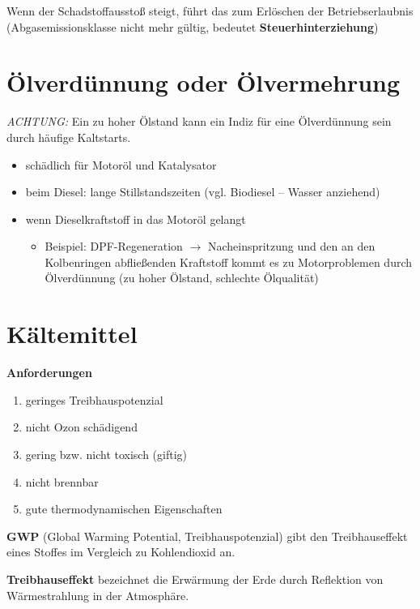 Wenn der Schadstoffausstoß steigt, führt das zum Erlöschen der
Betriebserlaubnis (Abgasemissionsklasse nicht mehr gültig, bedeutet
\textbf{Steuerhinterziehung})

\section{Ölverdünnung oder
Ölvermehrung}\label{oelverduennung-oder-oelvermehrung}

\emph{ACHTUNG:} Ein zu hoher Ölstand kann ein Indiz für eine
Ölverdünnung sein durch häufige Kaltstarts.

\begin{itemize}
\item
  schädlich für Motoröl und Katalysator
\item
  beim Diesel: lange Stillstandszeiten (vgl. Biodiesel -- Wasser
  anziehend)
\item
  wenn Dieselkraftstoff in das Motoröl gelangt

  \begin{itemize}
  \item
    Beispiel: DPF-Regeneration $\to$ Nacheinspritzung und den an den
    Kolbenringen abfließenden Kraftstoff kommt es zu Motorproblemen
    durch Ölverdünnung (zu hoher Ölstand, schlechte Ölqualität)
  \end{itemize}
\end{itemize}

\section{Kältemittel}\label{kaeltemittel}

\textbf{Anforderungen}

\begin{enumerate}
\item
  geringes Treibhauspotenzial
\item
  nicht Ozon schädigend
\item
  gering bzw. nicht toxisch (giftig)
\item
  nicht brennbar
\item
  gute thermodynamischen Eigenschaften
\end{enumerate}

\textbf{GWP} (Global Warming Potential, Treibhauspotenzial) gibt den
Treibhauseffekt eines Stoffes im Vergleich zu Kohlendioxid an.

\textbf{Treibhauseffekt} bezeichnet die Erwärmung der Erde durch
Reflektion von Wärmestrahlung in der Atmosphäre.

